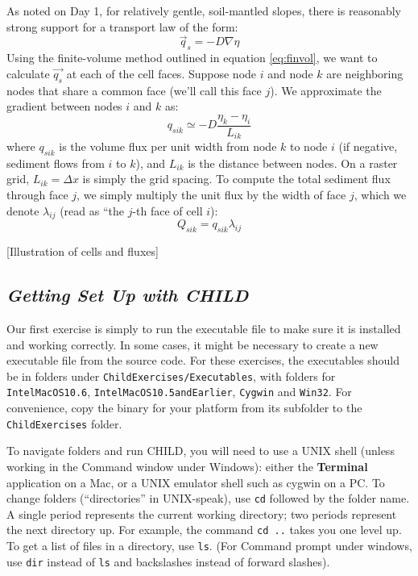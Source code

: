 \documentclass[12pt]{amsart}
\begin{document}
As noted on Day 1, for relatively gentle, soil-mantled slopes, there is reasonably strong support for a transport law of the form:
\begin{equation}
\vec{q}_s = -D \nabla \eta
\end{equation}
Using the finite-volume method outlined in equation \ref{eq:finvol}, we want to calculate $\vec{q_s}$ at each of the cell faces. Suppose node $i$ and node $k$ are neighboring nodes that share a common face (we'll call this face $j$). We approximate the gradient between nodes $i$ and $k$ as:
\begin{equation}
q_{sik} \simeq -D \frac{\eta_k - \eta_i}{L_{ik}}
\end{equation} 
where $q_{sik}$ is the volume flux per unit width from node $k$ to node $i$ (if negative, sediment flows from $i$ to $k$), and $L_{ik}$ is the distance between nodes. On a raster grid, $L_{ik} = \Delta x$ is simply the grid spacing. To compute the total sediment flux through face $j$, we simply multiply the unit flux by the width of face $j$, which we denote $\lambda_{ij}$ (read as ``the $j$-th face of cell $i$):
\begin{equation}
Q_{sik} = q_{sik} \lambda_{ij}
\end{equation}

[Illustration of cells and fluxes]

\subsection*{\em Getting Set Up with CHILD}

Our first exercise is simply to run the executable file to make sure it is installed and working correctly. In some cases, it might be necessary to create a new executable file from the source code. For these exercises, the executables should be in folders under {\tt ChildExercises/Executables}, with folders for {\tt IntelMacOS10.6}, {\tt IntelMacOS10.5andEarlier}, {\tt Cygwin} and {\tt Win32}. For convenience, copy the binary for your platform from its subfolder to the {\tt ChildExercises} folder.

To navigate folders and run CHILD, you will need to use a UNIX shell (unless working in the Command window under Windows): either the {\bf Terminal} application on a Mac, or a UNIX emulator shell such as cygwin on a PC. To change folders (``directories'' in UNIX-speak), use {\tt cd} followed by the folder name. A single period represents the current working directory; two periods represent the next directory up. For example, the command {\tt cd ..} takes you one level up. To get a list of files in a directory, use {\tt ls}. (For Command prompt under windows, use {\tt dir} instead of {\tt ls} and backslashes instead of forward slashes).
\end{document}
